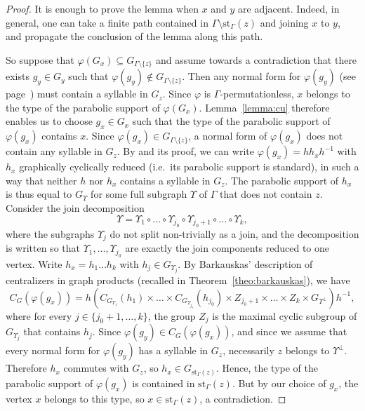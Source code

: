 \documentclass[a4paper,english,11pt]{article}
\theoremstyle{definition}
\theoremstyle{remark}
\newcommand{\st}{\mathrm{st}}
\begin{document}
\begin{proof}
It is enough to prove the lemma when $x$ and $y$ are adjacent. Indeed, in general, one can take a finite path contained in $\Gamma\setminus\st_{\Gamma}(z)$ and joining $x$ to $y$, and propagate the conclusion of the lemma along this path.
    
So suppose that $\varphi(G_x)\subseteq G_{\Gamma\setminus\{z\}}$ and assume towards a contradiction that there exists $g_y\in G_y$ such that $\varphi(g_y)\notin G_{\Gamma\setminus\{z\}}$. Then any normal form for $\varphi(g_y)$ (see page~\pageref{Def:Normal-forms}) must contain a syllable in $G_z$. Since $\varphi$ is $\Gamma$-permutationless, $x$ belongs to the type of the parabolic support of $\varphi(G_x)$. Lemma~\ref{lemma:cu} therefore enables us to choose $g_x\in G_x$ such that the type of the parabolic support of $\varphi(g_x)$ contains $x$. Since $\varphi(g_x)\in G_{\Gamma\setminus\{z\}}$, a normal form of $\varphi(g_x)$ does not contain any syllable in $G_z$. By \cite[Lemma~3.16]{Gre} and its proof, we can write $\varphi(g_x)=h h_x h^{-1}$ with $h_x$ graphically cyclically reduced (i.e.\ its parabolic support is standard), in such a way that neither $h$ nor $h_x$ contains a syllable in $G_z$. The parabolic support of $h_x$ is thus equal to $G_\Upsilon$ for some full subgraph $\Upsilon$ of $\Gamma$ that does not contain $z$. Consider the join decomposition \[\Upsilon=\Upsilon_1\circ\dots\circ\Upsilon_{j_0}\circ\Upsilon_{j_0+1}\circ\dots\circ\Upsilon_k,\] where the subgraphs $\Upsilon_j$ do not split non-trivially as a join, and the decomposition is written so that $\Upsilon_1,\dots,\Upsilon_{j_0}$ are exactly the join components reduced to one vertex. Write $h_x=h_1\dots h_k$ with $h_j\in G_{\Upsilon_j}$. By Barkauskas' description of centralizers in graph products (recalled in Theorem~\ref{theo:barkauskas}), we have 
    \begin{equation*}
        C_G\left(\varphi\left(g_x\right)\right)=h\left(
        C_{G_{\Upsilon_1}}(h_1)\times\dots\times C_{G_{\Upsilon_{j_0}}}(h_{j_0})\times Z_{j_0+1} \times\dots\times Z_k\times G_{\Upsilon^\perp} 
    \right)h^{-1},
    \end{equation*}
    where for every $j\in\{j_0+1,\dots,k\}$, the group $Z_j$ is the maximal cyclic subgroup of $G_{\Upsilon_j}$ that contains $h_j$. Since $\varphi(g_y)\in C_G(\varphi(g_x))$, and since we assume that every normal form for $\varphi(g_y)$ has a syllable in $G_z$, necessarily $z$ belongs to $\Upsilon^\perp$. Therefore $h_x$ commutes with $G_z$, so $h_x\in G_{\st_{\Gamma}(z)}$. Hence, the type of the parabolic support of $\varphi(g_x)$ is contained in $\st_{\Gamma}(z)$. But by our choice of $g_x$, the vertex $x$ belongs to this type, so $x\in\st_{\Gamma}(z)$, a contradiction.
\end{proof}
\end{document}
